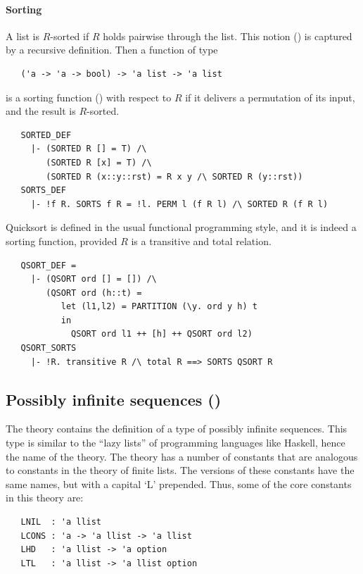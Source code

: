 \paragraph{Sorting}

A list is $R$-sorted if $R$ holds pairwise through the list. This
notion () is captured by a recursive definition. Then
a function of type
%
\begin{hol}
\begin{verbatim}
   ('a -> 'a -> bool) -> 'a list -> 'a list
\end{verbatim}
\end{hol}
%
is a sorting function () with respect to $R$ if
it delivers a permutation of its input, and the result is $R$-sorted.
%
\begin{hol}
\begin{verbatim}
   SORTED_DEF
     |- (SORTED R [] = T) /\
        (SORTED R [x] = T) /\
        (SORTED R (x::y::rst) = R x y /\ SORTED R (y::rst))
   SORTS_DEF
     |- !f R. SORTS f R = !l. PERM l (f R l) /\ SORTED R (f R l)
\end{verbatim}
\end{hol}
%
Quicksort is defined in the usual functional programming style, and
it is indeed a sorting function, provided $R$ is a transitive and
total relation.
%
\begin{hol}
\begin{verbatim}
   QSORT_DEF =
     |- (QSORT ord [] = []) /\
        (QSORT ord (h::t) =
           let (l1,l2) = PARTITION (\y. ord y h) t
           in
             QSORT ord l1 ++ [h] ++ QSORT ord l2)
   QSORT_SORTS
     |- !R. transitive R /\ total R ==> SORTS QSORT R
\end{verbatim}
\end{hol}


\subsection{Possibly infinite sequences (\theoryimp{llist})}


The theory  contains the definition of a type of
possibly infinite sequences.  This type is similar to the ``lazy
lists'' of programming languages like Haskell, hence the name of the
theory.  The \theoryimp{llist} theory has a number of constants that
are analogous to constants in the theory of finite
lists.  The \theoryimp{llist} versions of these constants have the
same names, but with a capital `L\/' prepended.  Thus, some of the core
constants in this theory are:
\begin{hol}
\begin{verbatim}
   LNIL  : 'a llist
   LCONS : 'a -> 'a llist -> 'a llist
   LHD   : 'a llist -> 'a option
   LTL   : 'a llist -> 'a llist option
\end{verbatim}
\end{hol}

